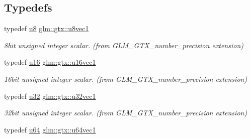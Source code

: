 \subsection*{Typedefs}
\begin{DoxyCompactItemize}
\item 
\mbox{\label{group__gtx__number__precision_ga35ae7849593a354420e4f52d1b36c2d6}} 
typedef \hyperlink{group__gtc__type__precision_ga5e3dc67373d5068997d2d9f41c9024d2}{u8} \hyperlink{group__gtx__number__precision_ga35ae7849593a354420e4f52d1b36c2d6}{glm\+::gtx\+::u8vec1}
\begin{DoxyCompactList}\small\item\em 8bit unsigned integer scalar. (from G\+L\+M\+\_\+\+G\+T\+X\+\_\+number\+\_\+precision extension) \end{DoxyCompactList}\item 
\mbox{\label{group__gtx__number__precision_ga807d7e5f24e981b1575bd40ca159781d}} 
typedef \hyperlink{group__gtc__type__precision_gae7a1571503f83d2264ddfa705a6b082a}{u16} \hyperlink{group__gtx__number__precision_ga807d7e5f24e981b1575bd40ca159781d}{glm\+::gtx\+::u16vec1}
\begin{DoxyCompactList}\small\item\em 16bit unsigned integer scalar. (from G\+L\+M\+\_\+\+G\+T\+X\+\_\+number\+\_\+precision extension) \end{DoxyCompactList}\item 
\mbox{\label{group__gtx__number__precision_gac46a7890b20928df83e734c3ea9557d4}} 
typedef \hyperlink{group__gtc__type__precision_ga54e837745059fd29017bed71cfa0a8db}{u32} \hyperlink{group__gtx__number__precision_gac46a7890b20928df83e734c3ea9557d4}{glm\+::gtx\+::u32vec1}
\begin{DoxyCompactList}\small\item\em 32bit unsigned integer scalar. (from G\+L\+M\+\_\+\+G\+T\+X\+\_\+number\+\_\+precision extension) \end{DoxyCompactList}\item 
\mbox{\label{group__gtx__number__precision_ga92812a1d7e746bcaba61d2f5a64afc52}} 
typedef \hyperlink{group__gtc__type__precision_ga71cedd4972f9cb1a5e14dfe5ab83ecd7}{u64} \hyperlink{group__gtx__number__precision_ga92812a1d7e746bcaba61d2f5a64afc52}{glm\+::gtx\+::u64vec1}

\end{DoxyCompactItemize}

